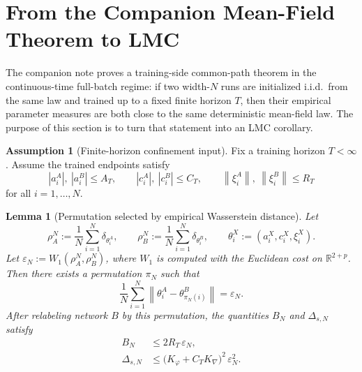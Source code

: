 \documentclass[11pt]{article}
\newtheorem{lemma}[theorem]{Lemma}
\theoremstyle{definition}
\newtheorem{assumption}[theorem]{Assumption}
\newcommand{\R}{\mathbb{R}}
\newcommand{\norm}[1]{\left\lVert #1 \right\rVert}
\begin{document}
\section{From the Companion Mean-Field Theorem to LMC}

The companion note proves a training-side common-path theorem in the
continuous-time full-batch regime: if two width-$N$ runs are initialized i.i.d.\
from the same law and trained up to a fixed finite horizon $T$, then their
empirical parameter measures are both close to the same deterministic
mean-field law. The purpose of this section is to turn that statement into an
LMC corollary.

\begin{assumption}[Finite-horizon confinement input]
\label{ass:confinement-input}
Fix a training horizon $T<\infty$. Assume the trained endpoints satisfy
\[
  |a_i^A|,\ |a_i^B|\le A_T,
  \qquad
  |c_i^A|,\ |c_i^B|\le C_T,
  \qquad
  \norm{\xi_i^A},\ \norm{\xi_i^B}\le R_T
\]
for all $i=1,\dots,N$.
\end{assumption}

\begin{lemma}[Permutation selected by empirical Wasserstein distance]
\label{lem:w1-permutation}
Let
\[
  \rho_A^N:=\frac1N\sum_{i=1}^N \delta_{\theta_i^A},
  \qquad
  \rho_B^N:=\frac1N\sum_{i=1}^N \delta_{\theta_i^B},
  \qquad
  \theta_i^X:=(a_i^X,c_i^X,\xi_i^X).
\]
Let $\varepsilon_N:=W_1(\rho_A^N,\rho_B^N)$, where $W_1$ is computed with the
Euclidean cost on $\R^{2+p}$. Then there exists a permutation $\pi_N$ such that
\begin{equation}
  \frac1N\sum_{i=1}^N \norm{\theta_i^A-\theta_{\pi_N(i)}^B}
  =
  \varepsilon_N.
  \label{eq:w1-permutation}
\end{equation}
After relabeling network $B$ by this permutation, the quantities
$B_N$ and $\Delta_{s,N}$ satisfy
\begin{align}
  B_N
  &\le
  2R_T\,\varepsilon_N,
  \label{eq:w1-to-BN}
  \\
  \Delta_{s,N}
  &\le
  \bigl(K_\varphi + C_T K_{\nabla}\bigr)^2\,\varepsilon_N^2.
  \label{eq:w1-to-scale}
\end{align}
\end{lemma}
\end{document}
